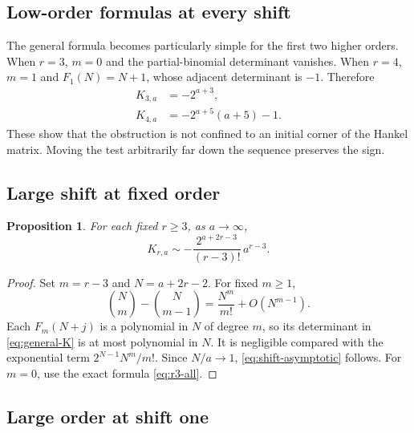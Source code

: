 \documentclass[11pt,a4paper]{article}
\newtheorem{proposition}[theorem]{Proposition}
\theoremstyle{definition}
\numberwithin{equation}{section}
\begin{document}
\subsection{Low-order formulas at every shift}

The general formula becomes particularly simple for the first two
higher orders. When $r=3$, $m=0$ and the partial-binomial determinant
vanishes. When $r=4$, $m=1$ and $F_1(N)=N+1$, whose adjacent determinant
is $-1$. Therefore
\begin{align}
 K_{3,a}&=-2^{a+3},\label{eq:r3-all}\\
 K_{4,a}&=-2^{a+5}(a+5)-1.\label{eq:r4-all}
\end{align}
These show that the obstruction is not confined to an initial corner of
the Hankel matrix. Moving the test arbitrarily far down the sequence
preserves the sign.

\subsection{Large shift at fixed order}

\begin{proposition}
\label{prop:shift-asymptotic}
For each fixed $r\ge3$, as $a\to\infty$,
\begin{equation}
 K_{r,a}\sim
 -\frac{2^{a+2r-3}}{(r-3)!}\,a^{r-3}.
 \label{eq:shift-asymptotic}
\end{equation}
\end{proposition}
\begin{proof}
Set $m=r-3$ and $N=a+2r-2$. For fixed $m\ge1$,
\[
 \binom Nm-\binom N{m-1}
   =\frac{N^m}{m!}+O(N^{m-1}).
\]
Each $F_m(N+j)$ is a polynomial in $N$ of degree $m$, so its determinant
in \eqref{eq:general-K} is at most polynomial in $N$. It is negligible
compared with the exponential term $2^{N-1}N^m/m!$. Since $N/a\to1$,
\eqref{eq:shift-asymptotic} follows. For $m=0$, use the exact formula
\eqref{eq:r3-all}.
\end{proof}

\subsection{Large order at shift one}
\end{document}
